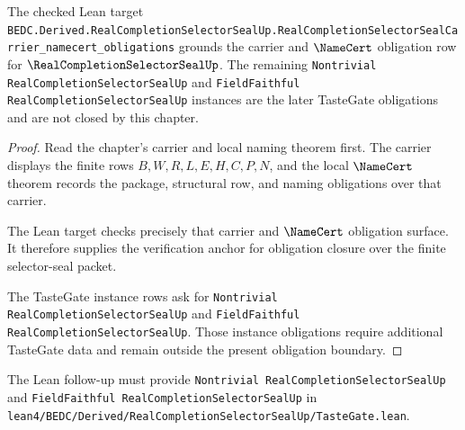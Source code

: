 \begin{theorem}
\label{thm:real-completion-selector-seal-tastegate-grounding}
The checked Lean target \texttt{BEDC.Derived.RealCompletionSelectorSealUp.RealCompletionSelectorSealCarrier\_namecert\_obligations} grounds the carrier and $\NameCert$ obligation row for $\RealCompletionSelectorSealUp$. The remaining \texttt{Nontrivial RealCompletionSelectorSealUp} and \texttt{FieldFaithful RealCompletionSelectorSealUp} instances are the later TasteGate obligations and are not closed by this chapter.
\end{theorem}
\begin{proof}
Read the chapter's carrier and local naming theorem first. The carrier displays the finite rows $B,W,R,L,E,H,C,P,N$, and the local $\NameCert$ theorem records the package, structural row, and naming obligations over that carrier.

The Lean target checks precisely that carrier and $\NameCert$ obligation surface. It therefore supplies the verification anchor for obligation closure over the finite selector-seal packet.

The TasteGate instance rows ask for \texttt{Nontrivial RealCompletionSelectorSealUp} and \texttt{FieldFaithful RealCompletionSelectorSealUp}. Those instance obligations require additional TasteGate data and remain outside the present obligation boundary.
\end{proof}

The Lean follow-up must provide \texttt{Nontrivial RealCompletionSelectorSealUp} and \texttt{FieldFaithful RealCompletionSelectorSealUp} in \texttt{lean4/BEDC/Derived/RealCompletionSelectorSealUp/TasteGate.lean}.

